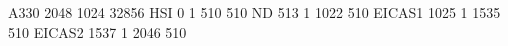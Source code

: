 A330 2048 1024 32856
HSI       0    1  510  510
ND      513    1 1022  510
EICAS1 1025    1 1535  510
EICAS2 1537    1 2046  510

